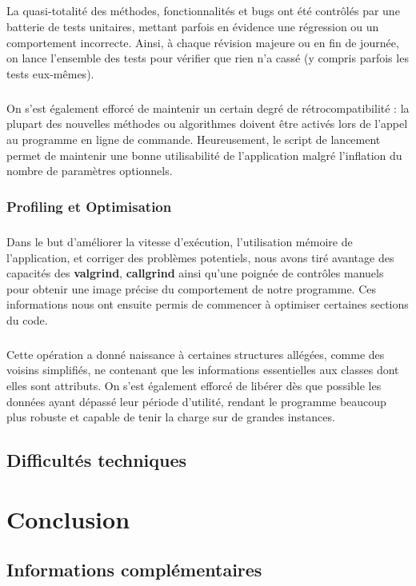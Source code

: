 \documentclass[a4paper,10pt]{report}
\begin{document}
\paragraph{}
  La quasi-totalité des méthodes, fonctionnalités et bugs ont été contrôlés par
une batterie de tests unitaires, mettant parfois en évidence une régression ou
un comportement incorrecte. Ainsi, à chaque révision majeure ou en fin de
journée, on lance l'ensemble des tests pour vérifier que rien n'a cassé (y
compris parfois les tests eux-mêmes).

\paragraph{}
  On s'est également efforcé de maintenir un certain degré de rétrocompatibilité
: la plupart des nouvelles méthodes ou algorithmes doivent être activés lors de
l'appel au programme en ligne de commande. Heureusement, le script de lancement
permet de maintenir une bonne utilisabilité de l'application malgré l'inflation
du nombre de paramètres optionnels.

\subsection{Profiling et Optimisation}
\paragraph{}
  Dans le but d'améliorer la vitesse d'exécution, l'utilisation mémoire de
l'application, et corriger des problèmes potentiels, nous avons tiré avantage
des capacités des \textbf{valgrind}, \textbf{callgrind} ainsi qu'une poignée de
contrôles manuels pour obtenir une image précise du comportement de notre
programme. Ces informations nous ont ensuite permis de commencer à optimiser
certaines sections du code.

\paragraph{}
  Cette opération a donné naissance à certaines structures allégées, comme des
voisins simplifiés, ne contenant que les informations essentielles aux classes
dont elles sont attributs. On s'est également efforcé de libérer dès que
possible les données ayant dépassé leur période d'utilité, rendant le programme
beaucoup plus robuste et capable de tenir la charge sur de grandes instances.


\section{Difficultés techniques}

\chapter*{Conclusion}
\section*{} %


\section*{Informations complémentaires}
\end{document}
